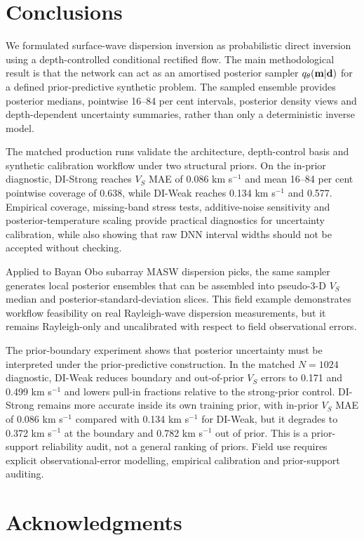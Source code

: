 \documentclass[referee]{gji}
\begin{document}
\section{Conclusions}

We formulated surface-wave dispersion inversion as probabilistic direct inversion using a depth-controlled conditional rectified flow. The main methodological result is that the network can act as an amortised posterior sampler $q_\theta({\bf m}|{\bf d})$ for a defined prior-predictive synthetic problem. The sampled ensemble provides posterior medians, pointwise 16--84 per cent intervals, posterior density views and depth-dependent uncertainty summaries, rather than only a deterministic inverse model.

The matched production runs validate the architecture, depth-control basis and synthetic calibration workflow under two structural priors. On the in-prior diagnostic, DI-Strong reaches $V_S$ MAE of 0.086 km s$^{-1}$ and mean 16--84 per cent pointwise coverage of 0.638, while DI-Weak reaches 0.134 km s$^{-1}$ and 0.577. Empirical coverage, missing-band stress tests, additive-noise sensitivity and posterior-temperature scaling provide practical diagnostics for uncertainty calibration, while also showing that raw DNN interval widths should not be accepted without checking.

Applied to Bayan Obo subarray MASW dispersion picks, the same sampler generates local posterior ensembles that can be assembled into pseudo-3-D $V_S$ median and posterior-standard-deviation slices. This field example demonstrates workflow feasibility on real Rayleigh-wave dispersion measurements, but it remains Rayleigh-only and uncalibrated with respect to field observational errors.

The prior-boundary experiment shows that posterior uncertainty must be interpreted under the prior-predictive construction. In the matched $N=1024$ diagnostic, DI-Weak reduces boundary and out-of-prior $V_S$ errors to 0.171 and 0.499 km s$^{-1}$ and lowers pull-in fractions relative to the strong-prior control. DI-Strong remains more accurate inside its own training prior, with in-prior $V_S$ MAE of 0.086 km s$^{-1}$ compared with 0.134 km s$^{-1}$ for DI-Weak, but it degrades to 0.372 km s$^{-1}$ at the boundary and 0.782 km s$^{-1}$ out of prior. This is a prior-support reliability audit, not a general ranking of priors. Field use requires explicit observational-error modelling, empirical calibration and prior-support auditing.

\section*{Acknowledgments}
\end{document}
